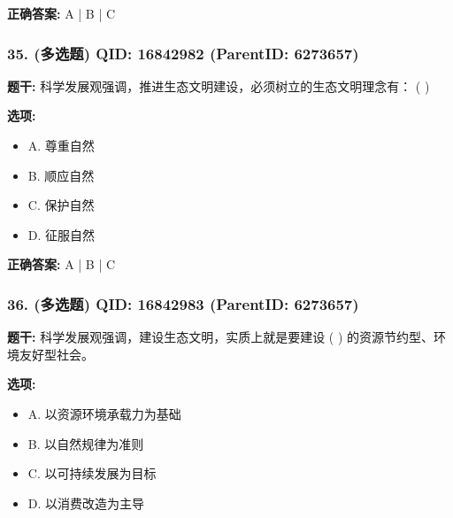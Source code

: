 \documentclass[12pt,UTF8]{ctexart}
\begin{document}
\textbf{正确答案:}
A | B | C

\vspace{0.3em}\hrulefill\vspace{0.7em}

\subsubsection*{35. (多选题) \small QID: 16842982 (ParentID: 6273657)}

\textbf{题干:}
科学发展观强调，推进生态文明建设，必须树立的生态文明理念有： ( )



\textbf{选项:}
\begin{itemize}[leftmargin=*]

  \item A. 尊重自然

  \item B. 顺应自然

  \item C. 保护自然

  \item D. 征服自然

\end{itemize}

\textbf{正确答案:}
A | B | C

\vspace{0.3em}\hrulefill\vspace{0.7em}

\subsubsection*{36. (多选题) \small QID: 16842983 (ParentID: 6273657)}

\textbf{题干:}
科学发展观强调，建设生态文明，实质上就是要建设 ( ) 的资源节约型、环境友好型社会。



\textbf{选项:}
\begin{itemize}[leftmargin=*]

  \item A. 以资源环境承载力为基础

  \item B. 以自然规律为准则

  \item C. 以可持续发展为目标

  \item D. 以消费改造为主导

\end{itemize}
\end{document}
